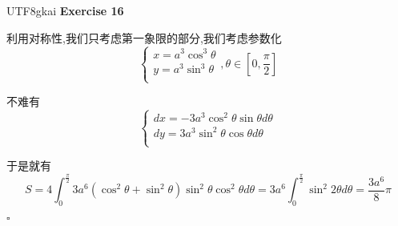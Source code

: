 \documentclass[11pt,hyperref,a4paper,UTF8]{ctexart}
\newenvironment{exercise}[1]{%
{\textbf{Exercise #1} \\ 
    }
}{
  \hfill $\square$ 
  \par\bigskip 
}
\newcommand{\bracket}[1]{\left[#1\right]}
\begin{document}
\begin{CJK}{UTF8}{gkai}
\begin{exercise}{16}
    利用对称性,我们只考虑第一象限的部分,我们考虑参数化
    \[\begin{cases}
        x = a^3 \cos^3 \theta\\
        y = a^3 \sin^3 \theta\\
    \end{cases}, \theta \in \bracket{0,\frac{\pi}{2}}
    \]

    不难有
    \[\begin{cases}
        dx = -3a^3 \cos^2 \theta \sin \theta d\theta\\
        dy = 3a^3 \sin^2 \theta \cos \theta d\theta\\
    \end{cases}\]

    于是就有
    \[S = 4 \int_{0}^{\frac{\pi}{2}} 3 a^6 (\cos^2 \theta + \sin^2 \theta) \sin^2 \theta \cos^2 \theta d\theta = 3a^6 \int_0^{\frac{\pi}{2}} \sin^2 2\theta d\theta = \frac{3a^6}{8}\pi\]
\end{exercise}

\end{CJK}
\end{document}
